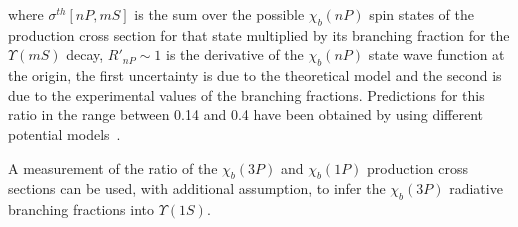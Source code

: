 \noindent where $\sigma^{th}[nP,mS]$ is the sum over the possible $\chi_b(nP)$ spin states of the production cross 
section for that state multiplied by its branching fraction for the $\Upsilon(mS)$ decay, $R'_{nP} \sim 1$ is the derivative 
of the $\chi_b(nP)$ state wave function at the origin, the first uncertainty is due to the theoretical model and the second 
is due to the experimental values of the branching fractions.  Predictions for this ratio in the range between 0.14 and 0.4 
have been obtained by using different potential models~\cite{Munz:1996hb,Ebert:2003mu,Anisovich:2005jp,Wang:2009er,Li:2009nr,Hwang:2010iq}. 

A measurement of the ratio of the $\chi_b(3P)$ and $\chi_b(1P)$ production cross sections can be used, with additional assumption, 
to infer the $\chi_b(3P)$ radiative branching fractions into $\Upsilon(1S)$. 

